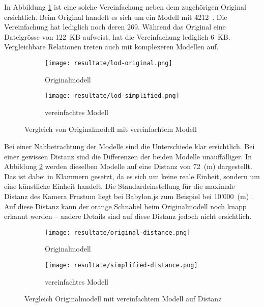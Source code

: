 In Abbildung \ref{fig:lodComparison} ist eine solche Vereinfachung neben dem zugehörigen Original ersichtlich. Beim Original handelt es sich um ein Modell mit 4212 . Die Vereinfachung hat lediglich noch deren 269. Während das Original eine Dateigrösse von 122 KB aufweist, hat die Vereinfachung lediglich 6 KB. Vergleichbare Relationen treten auch mit komplexeren Modellen auf.

\begin{figure}[H]
  \centering
  \begin{subfigure}{.4\textwidth}
    \centering
    \texttt{[image: resultate/lod-original.png]}
    \caption{Originalmodell}
  \end{subfigure}
  \begin{subfigure}{.4\textwidth}
    \centering
    \texttt{[image: resultate/lod-simplified.png]}
    \caption{vereinfachtes Modell}
  \end{subfigure}
  \caption{Vergleich von Originalmodell mit vereinfachtem Modell}
  \label{fig:lodComparison}
\end{figure}

Bei einer Nahbetrachtung der Modelle sind die Unterschiede klar ersichtlich. Bei einer gewissen Distanz sind die Differenzen der beiden Modelle unauffälliger. In Abbildung \ref{fig:lodComparisonDistance} werden dieselben Modelle auf eine Distanz von 72 (m) dargestellt. Das  ist dabei in Klammern gesetzt, da es sich um keine reale Einheit, sondern um eine künstliche Einheit handelt. Die Standardeinstellung für die maximale Distanz des Kamera Frustum liegt bei Babylon.js zum Beispiel bei 10'000 (m) \cite{babylonMaxZ}. Auf diese Distanz kann der orange Schnabel beim Originalmodell noch knapp erkannt werden – andere Details sind auf diese Distanz jedoch nicht ersichtlich.

\begin{figure}[H]
  \centering
  \begin{subfigure}{.4\textwidth}
    \centering
    \texttt{[image: resultate/original-distance.png]}
    \caption{Originalmodell}
  \end{subfigure}
  \begin{subfigure}{.4\textwidth}
    \centering
    \texttt{[image: resultate/simplified-distance.png]}
    \caption{vereinfachtes Modell}
  \end{subfigure}
  \caption{Vergleich Originalmodell mit vereinfachtem Modell auf Distanz}
  \label{fig:lodComparisonDistance}
\end{figure}

